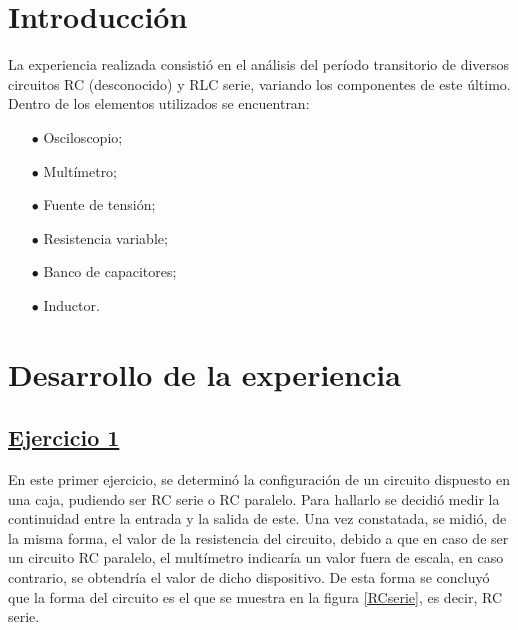 \documentclass[a4paper]{article}
\begin{document}




\section*{Introducción}
La experiencia realizada consistió en el análisis del período transitorio de diversos circuitos RC (desconocido) y RLC serie, variando los componentes de este último. Dentro de los elementos utilizados se encuentran:
	\begin{itemize}
	\item[$\bullet$]	Osciloscopio;
	\item[$\bullet$]	Multímetro;
	\item[$\bullet$]	Fuente de tensión;
	\item[$\bullet$]	Resistencia variable;
	\item[$\bullet$]	Banco de capacitores;
	\item[$\bullet$]	Inductor.
	\end{itemize}	  

\section*{Desarrollo de la experiencia}

\subsection*{\underline{Ejercicio 1}}


En este primer ejercicio, se determinó la configuración de un circuito dispuesto en una caja, pudiendo ser RC serie o RC paralelo. Para hallarlo se decidió medir la continuidad entre la entrada y la salida de este. Una vez constatada, se midió, de la misma forma,  el valor de la resistencia del circuito, debido a que en caso de ser un circuito RC paralelo, el multímetro indicaría un valor fuera de escala, en caso contrario, se obtendría el valor de dicho dispositivo. De esta forma se concluyó que la forma del circuito es el que se muestra en la figura \ref{RCserie}, es decir, RC serie.
\end{document}
